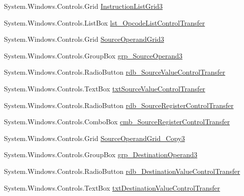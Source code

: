 \begin{DoxyCompactItemize}
\item 
System.\+Windows.\+Controls.\+Grid \hyperlink{class_c_p_u___o_s___simulator_1_1_instructions_window_a3cc76cf3ae5c4155d0e30727eb357d12}{Instruction\+List\+Grid3}
\item 
System.\+Windows.\+Controls.\+List\+Box \hyperlink{class_c_p_u___o_s___simulator_1_1_instructions_window_a111f1ddd903fe40e0c83efeca42bdf51}{lst\+\_\+\+Opcode\+List\+Control\+Transfer}
\item 
System.\+Windows.\+Controls.\+Grid \hyperlink{class_c_p_u___o_s___simulator_1_1_instructions_window_ab8409532df6419d7f7ce0c3450807906}{Source\+Operand\+Grid3}
\item 
System.\+Windows.\+Controls.\+Group\+Box \hyperlink{class_c_p_u___o_s___simulator_1_1_instructions_window_a59e5e9da77976ce8f2d8a43528b98f63}{grp\+\_\+\+Source\+Operand3}
\item 
System.\+Windows.\+Controls.\+Radio\+Button \hyperlink{class_c_p_u___o_s___simulator_1_1_instructions_window_a590a2e5af41ea5cf215da3ff7dd1b20b}{rdb\+\_\+\+Source\+Value\+Control\+Transfer}
\item 
System.\+Windows.\+Controls.\+Text\+Box \hyperlink{class_c_p_u___o_s___simulator_1_1_instructions_window_a602831ff353007879c08b22d373a2ba5}{txt\+Source\+Value\+Control\+Transfer}
\item 
System.\+Windows.\+Controls.\+Radio\+Button \hyperlink{class_c_p_u___o_s___simulator_1_1_instructions_window_a63fea6d97a26f4ed71753209dac85d24}{rdb\+\_\+\+Source\+Register\+Control\+Transfer}
\item 
System.\+Windows.\+Controls.\+Combo\+Box \hyperlink{class_c_p_u___o_s___simulator_1_1_instructions_window_a652354e464657693cf70a292b3389626}{cmb\+\_\+\+Source\+Register\+Control\+Transfer}
\item 
System.\+Windows.\+Controls.\+Grid \hyperlink{class_c_p_u___o_s___simulator_1_1_instructions_window_ac37123264ae139f4abc30841da21cd23}{Source\+Operand\+Grid\+\_\+\+Copy3}
\item 
System.\+Windows.\+Controls.\+Group\+Box \hyperlink{class_c_p_u___o_s___simulator_1_1_instructions_window_a175eb53a0a0f48be4d8717f1e5a5942e}{grp\+\_\+\+Destination\+Operand3}
\item 
System.\+Windows.\+Controls.\+Radio\+Button \hyperlink{class_c_p_u___o_s___simulator_1_1_instructions_window_afedaca6e4102fbae9f5db622be1b839d}{rdb\+\_\+\+Destination\+Value\+Control\+Transfer}
\item 
System.\+Windows.\+Controls.\+Text\+Box \hyperlink{class_c_p_u___o_s___simulator_1_1_instructions_window_a0049dce789d892e6620158859bcf7057}{txt\+Destination\+Value\+Control\+Transfer}

\end{DoxyCompactItemize}
